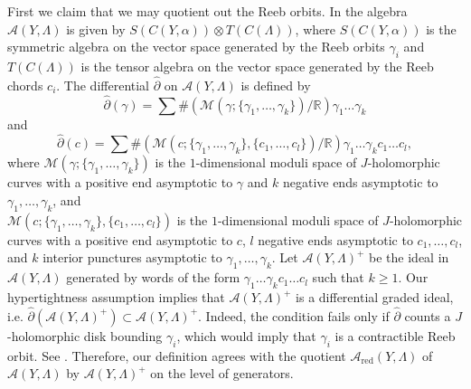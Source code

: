 \documentclass[11pt]{amsart}
\theoremstyle{mystyle}
\newcommand{\<}{\langle}
\renewcommand{\>}{\rangle}
\begin{document}
First we claim that we may quotient out the Reeb orbits. In \cite{egh2000SFT} the algebra $\mathcal{A}(Y, \Lambda)$ is given by $S(C(Y, \alpha)) \otimes T(C(\Lambda))$, where $S(C(Y, \alpha))$ is the symmetric algebra on the vector space generated by the Reeb orbits $\gamma_i$ and $T(C(\Lambda))$ is the tensor algebra on the vector space generated by the Reeb chords $c_i$. The differential $\widehat{\partial}$ on $\mathcal{A}(Y, \Lambda)$ is defined by \[\widehat{\partial}(\gamma) = \sum \#(\mathcal{M}(\gamma; \{\gamma_1, \dots , \gamma_k\})/\mathbb{R}) \gamma_1\dots \gamma_k\] and \[\widehat{\partial}(c) = \sum \#(\mathcal{M}(c; \{\gamma_1, \dots , \gamma_k\}, \{c_1, \dots , c_l\})/\mathbb{R}) \gamma_1\dots \gamma_k c_1\dots c_l,\] where $\mathcal{M}(\gamma; \{\gamma_1, \dots , \gamma_k\})$ is the $1$-dimensional moduli space of $J$-holomorphic curves with a positive end asymptotic to $\gamma$ and $k$ negative ends asymptotic to $\gamma_1, \dots , \gamma_k$, and \\ $\mathcal{M}(c; \{\gamma_1, \dots , \gamma_k\}, \{c_1, \dots , c_l\})$ is the $1$-dimensional moduli space of $J$-holomorphic curves with a positive end asymptotic to $c$, $l$ negative ends asymptotic to $c_1, \dots , c_l$, and $k$ interior punctures asymptotic to $\gamma_1, \dots , \gamma_k$.  Let $\mathcal{A}(Y, \Lambda)^+$ be the ideal in $\mathcal{A}(Y, \Lambda)$ generated by words of the form $\gamma_1\dots \gamma_k c_1\dots c_l$ such that $k \geq 1$. Our hypertightness assumption implies that $\mathcal{A}(Y, \Lambda)^+$ is a differential graded ideal, i.e. $\widehat{\partial}(\mathcal{A}(Y, \Lambda)^+) \subset \mathcal{A}(Y, \Lambda)^+$. Indeed, the condition fails only if $\widehat{\partial}$ counts a $J$-holomorphic disk bounding $\gamma_i$, which would imply that $\gamma_i$ is a contractible Reeb orbit. See . Therefore, our definition agrees with the quotient $\mathcal{A}_{\text{red}}(Y, \Lambda)$ of $\mathcal{A}(Y, \Lambda)$ by $\mathcal{A}(Y, \Lambda)^+$ on the level of generators.
\end{document}
